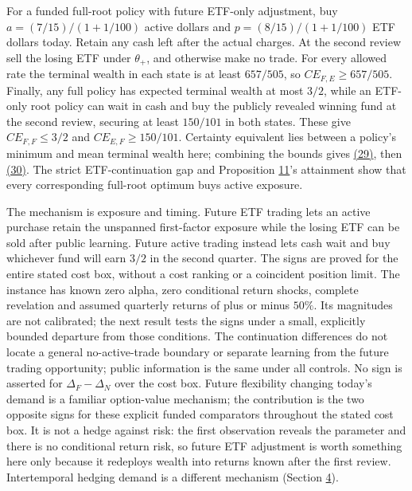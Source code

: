\documentclass[11pt]{article}
\begin{document}
For a funded full-root policy with future ETF-only adjustment,
buy \(a=(7/15)/(1+1/100)\) active dollars and
\(p=(8/15)/(1+1/100)\) ETF dollars today. Retain any cash
left after the actual charges. At the second review sell the
losing ETF under \(\theta_+\), and otherwise make no trade.
For every allowed rate the terminal wealth in each state is at
least \(657/505\), so \(CE_{F,E}\geq657/505\).
Finally, any full policy has expected terminal wealth at most
\(3/2\), while an ETF-only root policy can wait in cash and
buy the publicly revealed winning fund at the second review,
securing at least \(150/101\) in both states. These give
\(CE_{F,F}\leq3/2\) and \(CE_{E,F}\geq150/101\).
Certainty equivalent lies between a policy's minimum and mean
terminal wealth here; combining the bounds gives \hyperref[eq:29]{(29)}, then
\hyperref[eq:30]{(30)}. The strict ETF-continuation gap and Proposition \hyperref[res:Proposition-11]{11}'s
attainment show that every corresponding full-root optimum
buys active exposure.

The mechanism is exposure and timing. Future ETF trading lets
an active purchase retain the unspanned first-factor exposure
while the losing ETF can be sold after public learning. Future
active trading instead lets cash wait and buy whichever fund
will earn \(3/2\) in the second quarter. The signs are proved
for the entire stated cost box, without a cost ranking or a
coincident position limit. The instance has known zero alpha,
zero conditional return shocks, complete revelation and assumed
quarterly returns of plus or minus \(50\%\). Its magnitudes
are not calibrated; the next result tests the signs under a
small, explicitly bounded departure from those conditions.
The continuation differences do not locate a general
no-active-trade boundary or separate learning from
the future trading opportunity; public information is the
same under all controls. No sign is asserted for
\(\Delta_F-\Delta_N\) over the cost box. Future flexibility changing
today's demand is a familiar option-value mechanism; the contribution
is the two opposite signs for these explicit funded comparators
throughout the stated cost box. It is not a hedge against risk: the
first observation reveals the parameter and there is no conditional
return risk, so future ETF adjustment is worth something here only
because it redeploys wealth into returns known after the first
review. Intertemporal hedging demand is a different mechanism
(Section \hyperref[sec:4]{4}).
\end{document}
